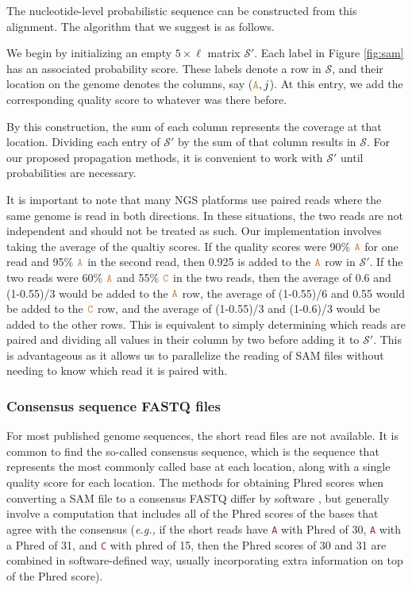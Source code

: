 \documentclass[
]{article}
\newcommand{\eg}{\textit{e.g.,}\xspace}
\newcommand{\sq}[1]{\texttt{\textcolor{brown}{#1}}}
\newcommand{\nps}{\mathcal{S}} %
\begin{document}
The nucleotide-level probabilistic sequence can be constructed from this
alignment. The algorithm that we suggest is as follows.

We begin by initializing an empty \(5\times\ell\) matrix \(\nps'\). Each
label in Figure \ref{fig:sam} has an associated probability score. These
labels denote a row in \(\nps\), and their location on the genome
denotes the columns, say (\(\sq{A}, j\)). At this entry, we add the
corresponding quality score to whatever was there before.

By this construction, the sum of each column represents the coverage at
that location. Dividing each entry of \(\nps'\) by the sum of that
column results in \(\nps\). For our proposed propagation methods, it is
convenient to work with \(\nps'\) until probabilities are necessary.

It is important to note that many NGS platforms use paired reads where
the same genome is read in both directions. In these situations, the two
reads are not independent and should not be treated as such. Our
implementation involves taking the average of the qualtiy scores. If the
quality scores were 90\% \(\sq{A}\) for one read and 95\% \(\sq{A}\) in
the second read, then 0.925 is added to the \(\sq{A}\) row in \(\nps'\).
If the two reads were 60\% \(\sq{A}\) and 55\% \(\sq{C}\) in the two
reads, then the average of 0.6 and (1-0.55)/3 would be added to the
\(\sq{A}\) row, the average of (1-0.55)/6 and 0.55 would be added to the
\(\sq{C}\) row, and the average of (1-0.55)/3 and (1-0.6)/3 would be
added to the other rows. This is equivalent to simply determining which
reads are paired and dividing all values in their column by two before
adding it to \(\nps'\). This is advantageous as it allows us to
parallelize the reading of SAM files without needing to know which read
it is paired with.

\hypertarget{consensus-sequence-fastq-files}{%
\subsubsection{Consensus sequence FASTQ
files}\label{consensus-sequence-fastq-files}}

For most published genome sequences, the short read files are not
available. It is common to find the so-called consensus sequence, which
is the sequence that represents the most commonly called base at each
location, along with a single quality score for each location. The
methods for obtaining Phred scores when converting a SAM file to a
consensus FASTQ differ by software
\citep[\citet{keithSimulatedAnnealingAlgorithm2002},
\citet{liMappingShortDNA2008}]{liAdjustQualityScores2004}, but generally
involve a computation that includes all of the Phred scores of the bases
that agree with the consensus (\eg if the short reads have \sq{A} with
Phred of 30, \sq{A} with a Phred of 31, and \sq{C} with phred of 15,
then the Phred scores of 30 and 31 are combined in software-defined way,
usually incorporating extra information on top of the Phred score).
\end{document}
